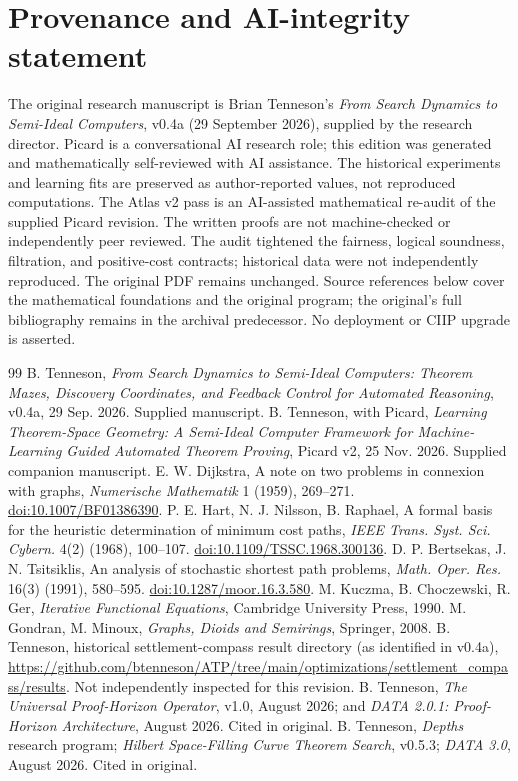 \documentclass[11pt]{article}
\theoremstyle{definition}\newtheorem{definition}[theorem]{Definition}\newtheorem{example}[theorem]{Example}\newtheorem{conjecture}[theorem]{Conjecture}
\begin{document}
\section*{Provenance and AI-integrity statement}
The original research manuscript is Brian Tenneson's \emph{From Search Dynamics to Semi-Ideal Computers}, v0.4a (29 September 2026), supplied by the research director. Picard is a conversational AI research role; this edition was generated and mathematically self-reviewed with AI assistance. The historical experiments and learning fits are preserved as author-reported values, not reproduced computations. The Atlas v2 pass is an AI-assisted mathematical re-audit of the supplied Picard revision. The written proofs are not machine-checked or independently peer reviewed. The audit tightened the fairness, logical soundness, filtration, and positive-cost contracts; historical data were not independently reproduced. The original PDF remains unchanged. Source references below cover the mathematical foundations and the original program; the original's full bibliography remains in the archival predecessor. No deployment or CIIP upgrade is asserted.
\small\begin{thebibliography}{99}
 B. Tenneson, \emph{From Search Dynamics to Semi-Ideal Computers: Theorem Mazes, Discovery Coordinates, and Feedback Control for Automated Reasoning}, v0.4a, 29 Sep. 2026. Supplied manuscript.
 B. Tenneson, with Picard, \emph{Learning Theorem-Space Geometry: A Semi-Ideal Computer Framework for Machine-Learning Guided Automated Theorem Proving}, Picard v2, 25 Nov. 2026. Supplied companion manuscript.
 E. W. Dijkstra, A note on two problems in connexion with graphs, \emph{Numerische Mathematik} 1 (1959), 269--271. \href{https://doi.org/10.1007/BF01386390}{doi:10.1007/BF01386390}.
 P. E. Hart, N. J. Nilsson, B. Raphael, A formal basis for the heuristic determination of minimum cost paths, \emph{IEEE Trans. Syst. Sci. Cybern.} 4(2) (1968), 100--107. \href{https://doi.org/10.1109/TSSC.1968.300136}{doi:10.1109/TSSC.1968.300136}.
 D. P. Bertsekas, J. N. Tsitsiklis, An analysis of stochastic shortest path problems, \emph{Math. Oper. Res.} 16(3) (1991), 580--595. \href{https://doi.org/10.1287/moor.16.3.580}{doi:10.1287/moor.16.3.580}.
 M. Kuczma, B. Choczewski, R. Ger, \emph{Iterative Functional Equations}, Cambridge University Press, 1990.
 M. Gondran, M. Minoux, \emph{Graphs, Dioids and Semirings}, Springer, 2008.
 B. Tenneson, historical settlement-compass result directory (as identified in v0.4a), \url{https://github.com/btenneson/ATP/tree/main/optimizations/settlement_compass/results}. Not independently inspected for this revision.
 B. Tenneson, \emph{The Universal Proof-Horizon Operator}, v1.0, August 2026; and \emph{DATA 2.0.1: Proof-Horizon Architecture}, August 2026. Cited in original.
 B. Tenneson, \emph{Depths} research program; \emph{Hilbert Space-Filling Curve Theorem Search}, v0.5.3; \emph{DATA 3.0}, August 2026. Cited in original.
\end{thebibliography}
\end{document}
